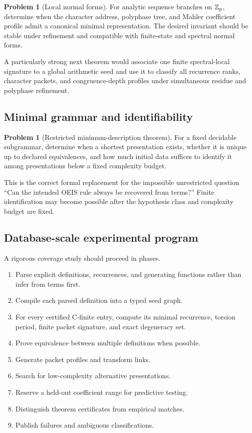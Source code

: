 \documentclass[11pt]{article}
\theoremstyle{definition}\newtheorem{definition}[theorem]{Definition}\newtheorem{example}[theorem]{Example}\newtheorem{construction}[theorem]{Construction}\newtheorem{algorithm}[theorem]{Algorithm}\newtheorem{conjecture}[theorem]{Conjecture}\newtheorem{problem}[theorem]{Problem}
\theoremstyle{remark}\newtheorem{remark}[theorem]{Remark}\newtheorem{boundary}[theorem]{Boundary}\newtheorem{certificate}[theorem]{Computational Certificate}\newtheorem{classical}[theorem]{Classical Input}\newtheorem{principle}[theorem]{Structural Principle}
\begin{document}
\begin{problem}[Local normal forms]
For analytic sequence branches on $\mathbb Z_p$, determine when the character address, polyphase tree, and Mahler coefficient profile admit a canonical minimal representation.  The desired invariant should be stable under refinement and compatible with finite-state and spectral normal forms.
\end{problem}

A particularly strong next theorem would associate one finite spectral-local signature to a global arithmetic seed and use it to classify all recurrence ranks, character packets, and congruence-depth profiles under simultaneous residue and polyphase refinement.

\subsection{Minimal grammar and identifiability}
\begin{problem}[Restricted minimum-description theorem]
For a fixed decidable subgrammar, determine when a shortest presentation exists, whether it is unique up to declared equivalences, and how much initial data suffices to identify it among presentations below a fixed complexity budget.
\end{problem}

This is the correct formal replacement for the impossible unrestricted question ``Can the intended OEIS rule always be recovered from terms?''  Finite identification may become possible after the hypothesis class and complexity budget are fixed.

\subsection{Database-scale experimental program}
A rigorous coverage study should proceed in phases.
\begin{enumerate}
\item Parse explicit definitions, recurrences, and generating functions rather than infer from terms first.
\item Compile each parsed definition into a typed seed graph.
\item For every certified C-finite entry, compute its minimal recurrence, torsion period, finite packet signature, and exact degeneracy set.
\item Prove equivalence between multiple definitions when possible.
\item Generate packet profiles and transform links.
\item Search for low-complexity alternative presentations.
\item Reserve a held-out coefficient range for predictive testing.
\item Distinguish theorem certificates from empirical matches.
\item Publish failures and ambiguous classifications.
\end{enumerate}
\end{document}
